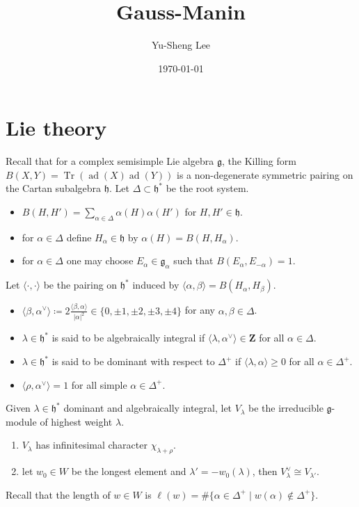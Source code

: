 \documentclass[leqno]{amsart}
\DeclareMathOperator{\adj}{ad}
\newcommand{\Z}{{\mathbf{Z}}}
\DeclareMathOperator{\Tr}{Tr}
\newcommand{\1}{\mathbf{1}}
\newcommand{\cfg}{\mathfrak{g}}
\newcommand{\cfh}{\mathfrak{h}}
\newcommand{\rt}{\Delta}
\theoremstyle{definition}
\theoremstyle{remark}
\begin{document}
\title{Gauss-Manin}
\author[Y-S.~Lee]{Yu-Sheng Lee}
\address{Department of Mathematics, University  of Michigan, Ann Arbor, MI 48109, USA}
\date{\today}

\setcounter{tocdepth}{1}


\section{Lie theory}

Recall that for a complex semisimple Lie algebra $\cfg$,
the Killing form  $B(X,Y)=\Tr(\adj(X)\adj(Y))$
is a non-degenerate symmetric pairing on
the Cartan subalgebra $\cfh$.
Let $\rt\subset\cfh^*$ be the root system.
\begin{itemize}
	\item $B(H,H')=\sum_{\alpha\in\rt}\alpha(H)\alpha(H')$
		for $H,H'\in \cfh$.
	\item for $\alpha\in\rt$ define $H_\alpha\in\cfh$ by
		$\alpha(H)=B(H,H_\alpha)$.
	\item for $\alpha\in\rt$ one may choose
		$E_\alpha\in \cfg_\alpha$
		such that $B(E_\alpha,E_{-\alpha})=1$.
\end{itemize}
Let $\langle\cdot,\cdot\rangle$
be the pairing on $\cfh^*$ induced by
$\langle\alpha,\beta\rangle=B(H_\alpha,H_\beta)$.
\begin{itemize}
	\item $\langle \beta,\alpha^\vee\rangle\coloneqq
		2\frac{\langle\beta,\alpha\rangle}{|\alpha|^2}
		\in\{0,\pm1,\pm2,\pm3,\pm4\}$
		for any $\alpha,\beta\in\rt$.
	\item  $\lambda\in \cfh^*$ is said to be
		algebraically integral if 
		$\langle \lambda,\alpha^\vee\rangle\in \Z$
		for all $\alpha\in\rt$.
	\item $\lambda\in \cfh^*$ is said to be
		dominant with respect to  $\rt^+$
		if $\langle\lambda,\alpha\rangle\geq0$
		for all $\alpha\in\rt^+$.
	\item $\langle \rho,\alpha^\vee\rangle=1$
		for all simple  $\alpha\in\rt^+$.
\end{itemize}
Given $\lambda\in\cfh^*$
dominant and algebraically integral,
let $V_\lambda$ be the irreducible
$\cfg$-module of highest weight $\lambda$.
\begin{enumerate}[label=(\alph*)]
	\item $V_\lambda$ has infinitesimal character 
		$\chi_{\lambda+\rho}$.
	\item let $w_0\in W$ be the longest element
		and  $\lambda'=-w_0(\lambda)$,
		then  $V_\lambda^\vee\cong V_{\lambda'}$.
\end{enumerate}
Recall that the length of $w\in W$
is $\ell(w)=\#\{\alpha\in \Delta^+\mid w(\alpha)\notin\Delta^+\}$.
\end{document}
